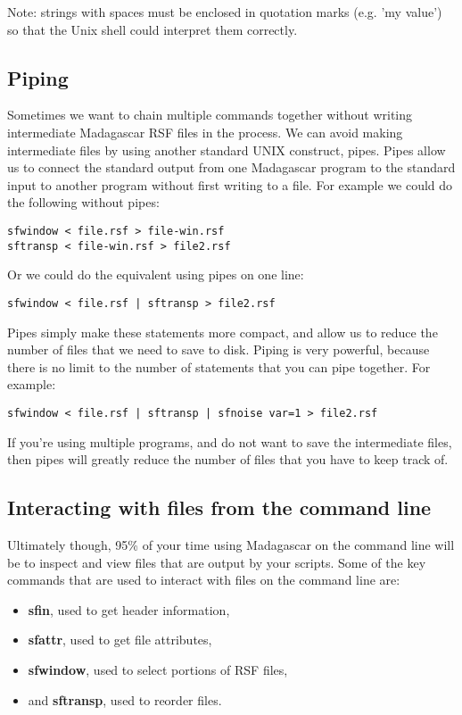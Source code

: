 Note: strings with spaces must be enclosed in quotation marks
(e.g. 'my value') so that the Unix shell could interpret them correctly.

\subsection{Piping}
Sometimes we want to chain multiple commands together without writing intermediate Madagascar RSF files in the process. We can avoid making intermediate files by using another standard UNIX construct, pipes. Pipes allow us to connect the standard output from one Madagascar program to the standard input to another program without first writing to a file. For example we could do the following without pipes:
\begin{verbatim}
sfwindow < file.rsf > file-win.rsf
sftransp < file-win.rsf > file2.rsf
\end{verbatim}
Or we could do the equivalent using pipes on one line:
\begin{verbatim}
sfwindow < file.rsf | sftransp > file2.rsf
\end{verbatim}
Pipes simply make these statements more compact, and allow us to reduce the number of files that we need to save to disk.  Piping is very powerful, because there is no limit to the number of statements that you can pipe together.  For example:

\begin{verbatim}
sfwindow < file.rsf | sftransp | sfnoise var=1 > file2.rsf 
\end{verbatim}
If you're using multiple programs, and do not want to save the intermediate files, then pipes will greatly reduce the number of files that you have to keep track of.  

\subsection{Interacting with files from the command line}

Ultimately though, 95\% of your time using Madagascar on the command line will be to inspect and view files that are output by your scripts. Some of the key commands that are used to interact with files on the command line are:
\begin{itemize}
\item \textbf{sfin}, used to get header information,
\item \textbf{sfattr}, used to get file attributes,
\item \textbf{sfwindow}, used to select portions of RSF files,
\item and \textbf{sftransp}, used to reorder files.
\end{itemize}

